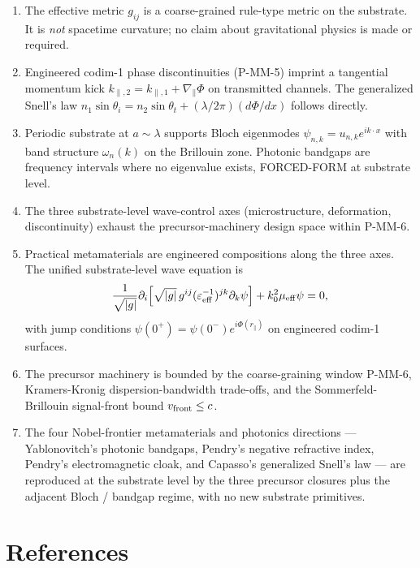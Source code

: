 \documentclass[11pt,a4paper]{article}
\begin{document}
\begin{enumerate}[noitemsep]
\item The effective metric $g_{ij}$ is a coarse-grained rule-type metric on the substrate. It is \emph{not} spacetime curvature; no claim about gravitational physics is made or required.
\item Engineered codim-1 phase discontinuities (P-MM-5) imprint a tangential momentum kick $k_{\parallel,2} = k_{\parallel,1} + \nabla_\parallel\Phi$ on transmitted channels. The generalized Snell's law $n_1 \sin\theta_i = n_2 \sin\theta_t + (\lambda/2\pi)(d\Phi/dx)$ follows directly.
\item Periodic substrate at $a \sim \lambda$ supports Bloch eigenmodes $\psi_{n, k} = u_{n, k} e^{i k\cdot x}$ with band structure $\omega_n(k)$ on the Brillouin zone. Photonic bandgaps are frequency intervals where no eigenvalue exists, FORCED-FORM at substrate level.
\item The three substrate-level wave-control axes (microstructure, deformation, discontinuity) exhaust the precursor-machinery design space within P-MM-6.
\item Practical metamaterials are engineered compositions along the three axes. The unified substrate-level wave equation is
\[
\frac{1}{\sqrt{|g|}}\partial_i\!\left[\sqrt{|g|}\,g^{ij}(\varepsilon_{\rm eff}^{-1})^{jk}\partial_k\psi\right] + k_0^2\mu_{\rm eff}\psi = 0,
\]
with jump conditions $\psi(0^+) = \psi(0^-) e^{i\Phi(r_\parallel)}$ on engineered codim-1 surfaces.
\item The precursor machinery is bounded by the coarse-graining window P-MM-6, Kramers-Kronig dispersion-bandwidth trade-offs, and the Sommerfeld-Brillouin signal-front bound $v_{\rm front} \le c$.
\item The four Nobel-frontier metamaterials and photonics directions --- Yablonovitch's photonic bandgaps, Pendry's negative refractive index, Pendry's electromagnetic cloak, and Capasso's generalized Snell's law --- are reproduced at the substrate level by the three precursor closures plus the adjacent Bloch / bandgap regime, with no new substrate primitives.
\end{enumerate}

\section{References}
\end{document}

